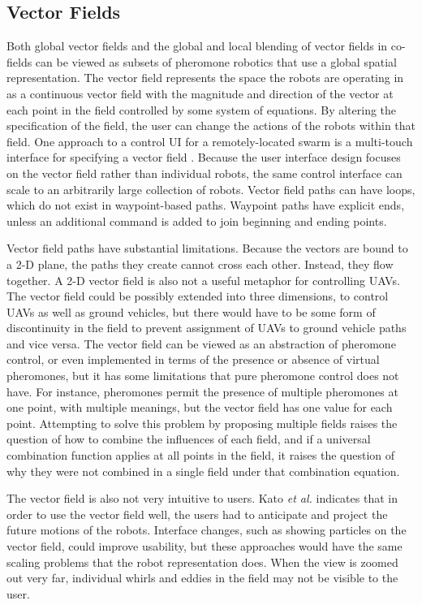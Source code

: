 \subsection{Vector Fields} \label{section:Vector_Fields}
Both global vector fields and the global and local blending of vector fields in co-fields can be viewed as subsets of pheromone robotics that use a global spatial representation. 
The vector field represents the space the robots are operating in as a continuous vector field with the magnitude and direction of the vector at each point in the field controlled by some system of equations.
By altering the specification of the field, the user can change the actions of the robots within that field. 
One approach to a control UI for a remotely-located swarm is a multi-touch interface for specifying a vector field \citep{Kato:2009:MIC:1520340.1520500}.
Because the user interface design focuses on the vector field rather than individual robots, the same control interface can scale to an arbitrarily large collection of robots. 
Vector field paths can have loops, which do not exist in waypoint-based paths. 
Waypoint paths have explicit ends, unless an additional command is added to join beginning and ending points. 

Vector field paths have substantial limitations. 
Because the vectors are bound to a 2-D plane, the paths they create cannot cross each other. 
Instead, they flow together. 
A 2-D vector field is also not a useful metaphor for controlling UAVs.
The vector field could be possibly extended into three dimensions, to control UAVs as well as ground vehicles, but there would have to be some form of discontinuity in the field to prevent assignment of UAVs to ground vehicle paths and vice versa. 
The vector field can be viewed as an abstraction of pheromone control, or even implemented in terms of the presence or absence of virtual pheromones, but it has some limitations that pure pheromone control does not have.
For instance, pheromones permit the presence of multiple pheromones at one point, with multiple meanings, but the vector field has one value for each point. 
Attempting to solve this problem by proposing multiple fields raises the question of how to combine the influences of each field, and if a universal combination function applies at all points in the field, it raises the question of why they were not combined in a single field under that combination equation. 

The vector field is also not very intuitive to users. 
Kato \emph{et al.} indicates that in order to use the vector field well, the users had to anticipate and project the future motions of the robots. 
Interface changes, such as showing particles on the vector field, could improve usability, but these approaches would have the same scaling problems that the robot representation does. 
When the view is zoomed out very far, individual whirls and eddies in the field may not be visible to the user. 

